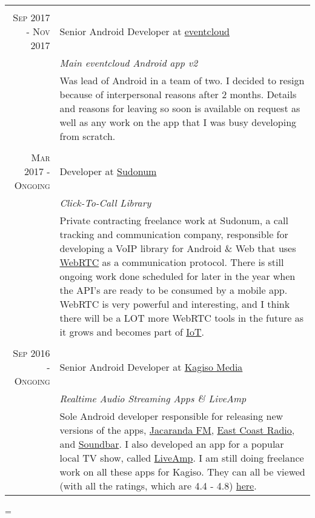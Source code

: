 \documentclass[a4paper,10pt,notitlepage]{article}
\newenvironment{absolutelynopagebreak}
  {\par\nobreak\vfil\penalty0\vfilneg
   \vtop\bgroup}
  {\par\xdef\tpd{\the\prevdepth}\egroup
   \prevdepth=\tpd}
\begin{document}
\begin{absolutelynopagebreak}
\begin{tabular}{r|p{11cm}}
		\multicolumn{2}{c}{} \\
		
		\textsc{Sep 2017 - Nov 2017} & Senior Android Developer at \href{www.eventcloud.co}{eventcloud}
		\\&\emph{Main eventcloud Android app v2}\\&\footnotesize{Was lead of Android in a team of two. I decided to resign because of interpersonal reasons after 2 months. Details and reasons for leaving so soon is available on request as well as any work on the app that I was busy developing from scratch.} \\
		
		\multicolumn{2}{c}{} \\
		
		\textsc{Mar 2017 - Ongoing}  & Developer at \href{www.sudonum.com}{Sudonum}
		\\&\emph{Click-To-Call Library}\\&\footnotesize{Private contracting freelance work at Sudonum, a call tracking and communication company, responsible for developing a VoIP library for Android \& Web that uses \href{https://en.wikipedia.org/wiki/WebRTC}{WebRTC} as a communication protocol. There is still ongoing work done scheduled for later in the year when the API's are ready to be consumed by a mobile app. WebRTC is very powerful and interesting, and I think there will be a LOT more WebRTC tools in the future as it grows and becomes part of
		\href{https://en.wikipedia.org/wiki/Internet_of_things}{IoT}.} \\
		
		\multicolumn{2}{c}{} \\
		\textsc{Sep 2016 - Ongoing}  & Senior Android Developer at \href{www.kagisomedia.co.za}{Kagiso Media}                                               \\&\emph{Realtime Audio Streaming Apps \& LiveAmp}\\&\footnotesize{Sole Android developer responsible for releasing new versions of the apps, \href{https://play.google.com/store/apps/details?id=com.kagiso.jacarandafm}{Jacaranda FM},  \href{https://play.google.com/store/apps/details?id=com.kagiso.ecr}{East Coast Radio}, and \href{https://play.google.com/store/apps/details?id=com.kagiso.soundbar}{Soundbar}. I also developed an app for a popular local TV show, called  \href{https://play.google.com/store/apps/details?id=com.kagiso.liveamp}{LiveAmp}. I am still doing freelance work on all these apps for Kagiso. They can all be viewed (with all the ratings, which are 4.4 - 4.8) \href{https://play.google.com/store/apps/developer?id=Kagiso+Media}{here}}. \\
		

\end{tabular}
\end{absolutelynopagebreak}
\end{document}
